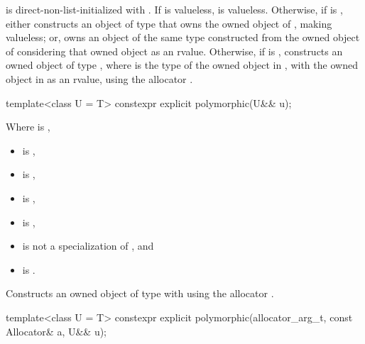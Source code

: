 \begin{itemdescr}
\pnum
\effects
{} is direct-non-list-initialized with .
If  is valueless,  is valueless.
Otherwise,
if  is ,
either constructs an object of type  that
owns the owned object of ,
making  valueless; or,
owns an object of the same type constructed from
the owned object of 
considering that owned object as an rvalue.
Otherwise,
if  is ,
constructs an owned object of type ,
where  is the type of the owned object in ,
with the owned object in  as an rvalue,
using the allocator .
\end{itemdescr}

%
\begin{itemdecl}
template<class U = T>
  constexpr explicit polymorphic(U&& u);
\end{itemdecl}

\begin{itemdescr}
\pnum
\constraints
Where  is ,
\begin{itemize}
\item
{} is ,
\item
{} is ,
\item
{} is ,
\item
{} is ,
\item
{} is not a specialization of , and
\item
{} is .
\end{itemize}

\pnum
\effects
Constructs an owned object of type  with 
using the allocator .
\end{itemdescr}

%
\begin{itemdecl}
template<class U = T>
  constexpr explicit polymorphic(allocator_arg_t, const Allocator& a, U&& u);
\end{itemdecl}

